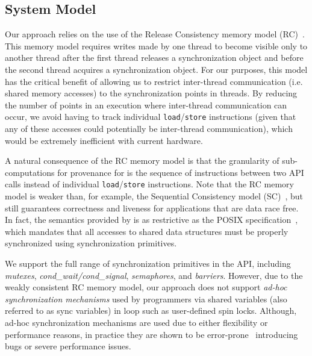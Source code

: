 \subsection{System Model}
\label{sec:model}

 Our approach relies on the use of the
Release Consistency memory model (RC)~\cite{DSM-RC}. This memory model 
requires writes made by one thread to become visible only to another thread after the
first thread releases a synchronization object and before the second thread
acquires a synchronization object. For our purposes, this model has the critical
benefit of allowing us to restrict inter-thread communication (i.e. shared
memory accesses) to the synchronization points in threads. By reducing the number of 
points in an execution where inter-thread communication can occur, we avoid
having to track individual {\tt load}/{\tt store} instructions (given that any of these
accesses could potentially be inter-thread communication), which would 
be extremely inefficient with current hardware. 

A natural consequence of the RC memory model is that the granularity of sub-computations for provenance for \projecttitle is the sequence of instructions between two \pthreads API calls instead of  individual {\tt load}/{\tt store} instructions. Note that the RC memory model is weaker
than, for example, the Sequential Consistency model (SC)~\cite{scLamport}, but
still guarantees correctness and liveness for applications that are data race
free. In fact,  the semantics provided by
\projecttitle is as restrictive as the POSIX specification~\cite{pthreads-spec}, which mandates that all accesses to shared data structures must be properly synchronized using 
\pthreads synchronization primitives. 

 We support the full range of synchronization
primitives in the \pthreads API, including {\em mutexes}, {\em cond\_wait/cond\_signal}, {\em semaphores},  and {\em
barriers}. However, due to the weakly consistent RC memory model, our approach
does not support {\em ad-hoc synchronization mechanisms} used by programmers via
shared variables (also referred to as sync variables) in loop such as user-defined spin locks. 
Although, ad-hoc synchronization mechanisms are used due to either flexibility
or performance reasons, in practice they are shown to be
error-prone~\cite{adhoc-sync} introducing bugs or severe performance issues.